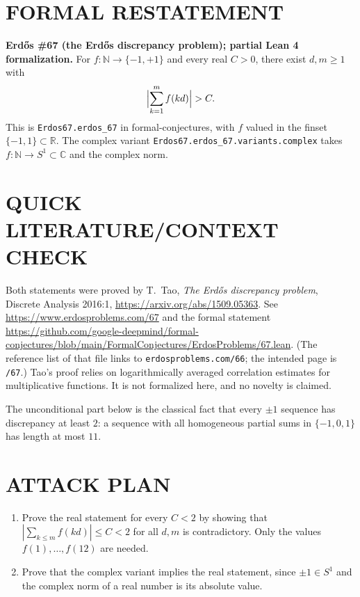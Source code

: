\section{FORMAL RESTATEMENT}
\textbf{Erd\H{o}s \#67 (the Erd\H{o}s discrepancy problem); partial Lean 4 formalization.}
For $f:\mathbb{N}\to\{-1,+1\}$ and every real $C>0$, there exist $d,m\ge1$ with
\[
 \Bigl|\sum_{k=1}^{m} f(kd)\Bigr| > C .
\]
This is \texttt{Erdos67.erdos\_67} in formal-conjectures, with $f$ valued in the finset $\{-1,1\}\subset\mathbb{R}$. The complex variant \texttt{Erdos67.erdos\_67.variants.complex} takes $f:\mathbb{N}\to S^1\subset\mathbb{C}$ and the complex norm.

\section{QUICK LITERATURE/CONTEXT CHECK}
Both statements were proved by T.~Tao, \emph{The Erd\H{o}s discrepancy problem}, Discrete Analysis 2016:1, \url{https://arxiv.org/abs/1509.05363}. See \url{https://www.erdosproblems.com/67} and the formal statement \url{https://github.com/google-deepmind/formal-conjectures/blob/main/FormalConjectures/ErdosProblems/67.lean}. (The reference list of that file links to \texttt{erdosproblems.com/66}; the intended page is \texttt{/67}.) Tao's proof relies on logarithmically averaged correlation estimates for multiplicative functions. It is not formalized here, and no novelty is claimed.

The unconditional part below is the classical fact that every $\pm1$ sequence has discrepancy at least $2$: a sequence with all homogeneous partial sums in $\{-1,0,1\}$ has length at most $11$.

\section{ATTACK PLAN}
\begin{enumerate}
\item Prove the real statement for every $C<2$ by showing that $|\sum_{k\le m}f(kd)|\le C<2$ for all $d,m$ is contradictory. Only the values $f(1),\dots,f(12)$ are needed.
\item Prove that the complex variant implies the real statement, since $\pm1\in S^1$ and the complex norm of a real number is its absolute value.
\end{enumerate}

